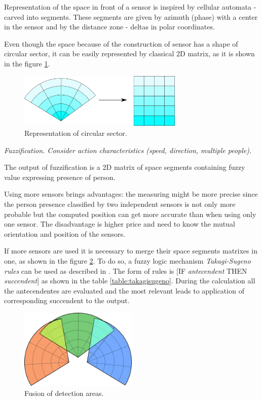 Representation of the space in front of a sensor is inspired by cellular automata - carved into
segments. These segments are given by azimuth (phase) with a center in the sensor and by
the distance zone - deltas in polar coordinates.

Even though the space because of the construction of sensor has a shape of circular sector,
it can be easily represented by classical 2D matrix, as it is shown in the figure \ref{fig:circularsector}.

\begin{figure}[h!]
\begin{center}
\includegraphics[width=0.7\textwidth]{obrazky-figures/circularsector_transformation.png}
\caption{Representation of circular sector.\label{fig:circularsector}}
\end{center}
\end{figure}

{\it Fuzzification. Consider action characteristics (speed, direction, multiple people).}

The output of fuzzification is a 2D matrix of space segments containing fuzzy value expressing
presence of person.

Using more sensors brings advantages: the measuring might be more precise since the person presence
classified by two independent sensors is not only more probable but the computed position
can get more accurate than when using only one sensor. The disadvantage is higher price and need
to know the mutual orientation and position of the sensors. 

If more sensors are used it is necessary to merge their space segments matrixes in one,
as shown in the figure \ref{fig:3pir_area}. To do so, a fuzzy logic mechanism
{\it Takagi-Sugeno rules} can be used as described in \cite{InsightIntoFuzzyModelling}.
The form of rules is [IF {\it antecendent} THEN {\it succendent}] as shown in the table
\ref{table:takagisugeno}. During the calculation all the antecendentes are evaluated
and the most relevant leads to application of corresponding succendent to the output.

\begin{figure}[h!]
\begin{center}
\includegraphics[width=0.5\textwidth]{obrazky-figures/3pir_area.png}
\caption{Fusion of detection areas.\label{fig:3pir_area}}
\end{center}
\end{figure}

